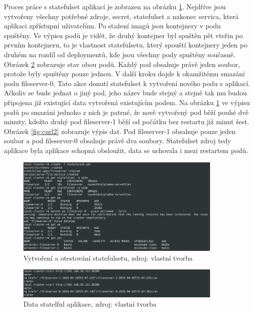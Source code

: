 \par      Proces práce s statefulset aplikací je zobrazen na obrázku \ref{fig:statefulset}. Nejdříve jsou \linebreak vytvořeny všechny potřebné zdroje, secret, statefulset a nakonec servica, která aplikaci zpřístupní uživatelům. Po stažení imagů jsou kontejnery v podu spuštěny. Ve výpisu podů je vidět, že druhý kontejner byl spuštěn pět vteřin po prvním kontejneru, to je vlastnost statefulsetu, který spouští kontejnery jeden po druhém na rozdíl od deploymentů, kde jsou všechny pody spuštěny současně. Obrázek \ref{fig:curl1} zobrazuje stav obou podů. Každý pod obsahuje právě jeden soubor, protože byly spuštěny pouze jednou. V další kroku dojde k okamžitému smazání podu fileserver-0. Tato akce donutí statefulset k vytvoření nového podu s aplikací. Ačkoliv se bude jednat o jiný pod, jeho název bude stejný a stejně tak mu budou připojena již existující data vytvořená existujícím podem. Na obrázku \ref{fig:statefulset} ve výpisu podů po smazání jednoho z nich je patrné, že nově vytvořený pod běží pouhé dvě minuty, kdežto druhý pod fileserver-1 běží od počátku bez restartu již minut šest. Obrázek \ref{fig:curl2} zobrazuje výpis dat. Pod fileserver-1 obsahuje pouze jeden soubor a pod fileserver-0 obsahuje právě dva soubory. Statefulset zdroj tedy aplikace byla aplikace schopná obsloužit, data se uchovala i mezi restartem podů.

\begin{figure}[H]
  \begin{centering}
	  \includegraphics[width=0.9\textwidth]{images/statefulset.png}
    \par
	  \caption{Vytvoření a otestování statefulsetu\label{fig:statefulset}, zdroj: vlastní tvorba}
    \end{centering}
\end{figure}


\begin{figure}[H]
  \begin{centering}
	  \includegraphics[width=0.9\textwidth]{images/curl1.png}
    \par
	  \caption{Data statelful aplikace\label{fig:curl1}, zdroj: vlastní tvorba}
    \end{centering}
\end{figure}


